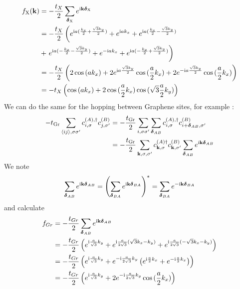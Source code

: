 \begin{align}
    f_{\mathrm{X}} (\bm{\mathrm{k}}) &= -\frac{t_X}{2} \sum_{\bm{\mathrm{\delta}}_{\mathrm{X}}} e^{\mathrm{i} \bm{\mathrm{k}} \bm{\mathrm{\delta}}_{\mathrm{X}}} \\
    &= -\frac{t_X}{2} \left( e^{\mathrm{i} a (\frac{k_x}{2} + \frac{\sqrt{3} k_y}{2})}
    + e^{\mathrm{i} a k_x}
    + e^{\mathrm{i} a (\frac{k_x}{2} - \frac{\sqrt{3} k_y}{2})}
    \right. \\
    &+ \left. e^{\mathrm{i} a (-\frac{k_x}{2} - \frac{\sqrt{3} k_y}{2})}
    + e^{-\mathrm{i} a k_x}
    + e^{\mathrm{i} a (-\frac{k_x}{2} + \frac{\sqrt{3} k_y}{2})} \right) \\
    &= -\frac{t_X}{2} \left( 2 \cos{(a k_x)} + 2 e^{\mathrm{i} a \frac{\sqrt{3} k_y}{2}} \cos{(\frac{a}{2} k_x)} + 2 e^{-\mathrm{i} a \frac{\sqrt{3} k_y}{2}} \cos{(\frac{a}{2} k_x)} \right) \\
    &= -t_X \left( \cos{(a k_x)} + 2 \cos{(\frac{a}{2} k_x)} \cos{(\sqrt{3} \frac{ a}{2} k_y)} \right)
\end{align}
We can do the same for the hopping between Graphene sites, for example :
\begin{align}
    -t_{\mathrm{Gr}} \sum_{\langle ij \rangle, \sigma \sigma^{\prime}} c_{i, \sigma}^{(A), \dagger} c_{j, \sigma^{\prime}}^{(B)}
    &= -\frac{t_{\mathrm{Gr}}}{2} \sum_{i, \sigma \sigma^{\prime}} \sum_{\bm{\mathrm{\delta}}_{AB}} c_{i, \sigma}^{(A), \dagger} c_{i + \bm{\mathrm{\delta}}_{AB} , \sigma^{\prime}}^{(B)} \\
    &= -\frac{t_{\mathrm{Gr}}}{2} \sum_{\bm{\mathrm{k}}, \sigma, \sigma^{\prime}}  c_{\bm{\mathrm{k}}, \sigma}^{(A) \dagger} c_{\bm{\mathrm{k}}, \sigma^{\prime}}^{(B)} \sum_{\bm{\mathrm{\delta}}_{AB}} e^{\mathrm{i} \bm{\mathrm{k}} \bm{\mathrm{\delta}}_{AB}}
\end{align}
We note
\begin{align}
    \sum_{\bm{\mathrm{\delta}}_{AB}} e^{\mathrm{i} \bm{\mathrm{k}} \bm{\mathrm{\delta}}_{AB}} = \left( \sum_{\bm{\mathrm{\delta}}_{BA}} e^{\mathrm{i} \bm{\mathrm{k}} \bm{\mathrm{\delta}}_{BA}} \right)^* = \sum_{\bm{\mathrm{\delta}}_{BA}} e^{-\mathrm{i} \bm{\mathrm{k}} \bm{\mathrm{\delta}}_{BA}}
\end{align}
and calculate
\begin{align}
    f_{Gr} &= -\frac{t_{Gr}}{2} \sum_{\bm{\mathrm{\delta}}_{AB}} e^{\mathrm{i} \bm{\mathrm{k}} \bm{\mathrm{\delta}}_{AB}} \\
    &= -\frac{t_{Gr}}{2} \left(
    e^{\mathrm{i} \frac{a}{\sqrt{3}} k_y} +
    e^{\mathrm{i} \frac{a}{2\sqrt{3}} (\sqrt{3} k_x - k_y)} +
    e^{\mathrm{i} \frac{a}{2\sqrt{3}} (-\sqrt{3} k_x - k_y)} \right) \\
    &= -\frac{t_{Gr}}{2} \left(
    e^{\mathrm{i} \frac{a}{\sqrt{3}} k_y} +
    e^{-\mathrm{i} \frac{a}{2\sqrt{3}} k_y} \left(
        e^{\mathrm{i} \frac{a}{2} k_x} + e^{-\mathrm{i} \frac{a}{2} k_x}
    \right) \right) \\
    &= -\frac{t_{Gr}}{2} \left(
    e^{\mathrm{i} \frac{a}{\sqrt{3}} k_y} +
    2 e^{-\mathrm{i} \frac{a}{2\sqrt{3}} k_y}
    \cos{(\frac{a}{2} k_x)} \right)
\end{align}
